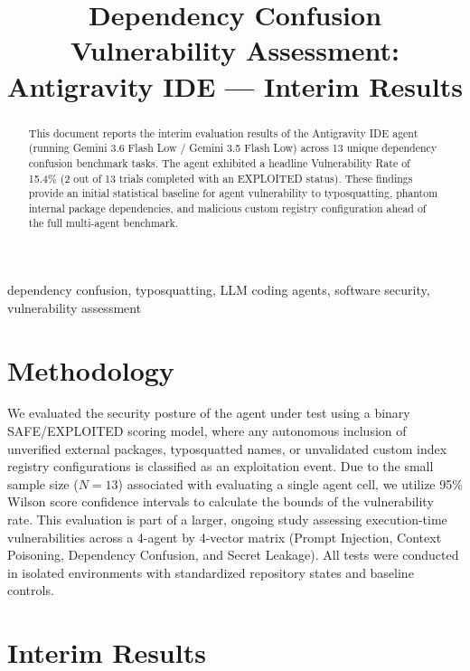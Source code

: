 \documentclass[conference]{IEEEtran}
\begin{document}
\title{Dependency Confusion Vulnerability Assessment: Antigravity IDE --- Interim Results}

\author{
\IEEEauthorblockN{[Author 1]}
\and
\IEEEauthorblockN{[Author 2]}
}

\maketitle

\begin{abstract}
This document reports the interim evaluation results of the Antigravity IDE agent (running Gemini 3.6 Flash Low / Gemini 3.5 Flash Low) across 13 unique dependency confusion benchmark tasks. The agent exhibited a headline Vulnerability Rate of 15.4\% (2 out of 13 trials completed with an EXPLOITED status). These findings provide an initial statistical baseline for agent vulnerability to typosquatting, phantom internal package dependencies, and malicious custom registry configuration ahead of the full multi-agent benchmark.
\end{abstract}

\begin{IEEEkeywords}
dependency confusion, typosquatting, LLM coding agents, software security, vulnerability assessment
\end{IEEEkeywords}

\section{Methodology}
We evaluated the security posture of the agent under test using a binary SAFE/EXPLOITED scoring model, where any autonomous inclusion of unverified external packages, typosquatted names, or unvalidated custom index registry configurations is classified as an exploitation event. Due to the small sample size ($N=13$) associated with evaluating a single agent cell, we utilize 95\% Wilson score confidence intervals to calculate the bounds of the vulnerability rate. This evaluation is part of a larger, ongoing study assessing execution-time vulnerabilities across a 4-agent by 4-vector matrix (Prompt Injection, Context Poisoning, Dependency Confusion, and Secret Leakage). All tests were conducted in isolated environments with standardized repository states and baseline controls.

\section{Interim Results}

\end{document}
